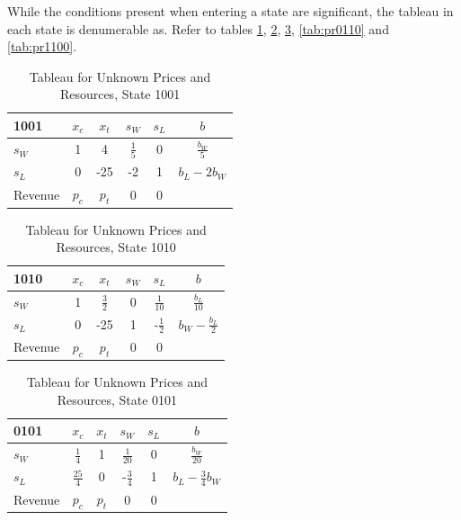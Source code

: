 While the conditions present when entering a state are significant, the tableau in each state is denumerable as. Refer to tables \ref{tab:pr1001}, \ref{tab:pr1010}, \ref{tab:pr0101}, \ref{tab:pr0110} and \ref{tab:pr1100}. 

\begin{table}
\centering
\begin{tabular}{| l | c c c c | c |}
\hline
1001    & $x_c$ & $x_t$ & $s_W$ & $s_L$ & $b$\\
\hline
$s_W$   & 1     & 4      & $\frac{1}{5}$   & 0     & $\frac{b_W}{5}$\\
$s_L$   & 0     & -25    & -2              & 1     & $b_L - 2b_W$\\
\hline
Revenue & $p_c$    & $p_t$    & 0     & 0     &\\
\hline
\end{tabular}
  \caption[Tableau for Unknown Prices and Resources, State 1001]
          {Tableau for Unknown Prices and Resources, State 1001}
  \label{tab:pr1001}
\end{table}

\begin{table}
\centering
\begin{tabular}{| l | c c c c | c |}
\hline
1010    & $x_c$ & $x_t$ & $s_W$ & $s_L$ & $b$\\
\hline
$s_W$   & 1     & $\frac{3}{2}$  & 0   & $\frac{1}{10}$  & $\frac{b_L}{10}$\\
$s_L$   & 0     & -25            & 1   & -$\frac{1}{2}$  & $b_W - \frac{b_L}{2}$\\
\hline
Revenue & $p_c$    & $p_t$    & 0     & 0     &\\
\hline
\end{tabular}
  \caption[Tableau for Unknown Prices and Resources, State 1010]
          {Tableau for Unknown Prices and Resources, State 1010}
  \label{tab:pr1010}
\end{table}

\begin{table}
\centering
\begin{tabular}{| l | c c c c | c |}
\hline
0101    & $x_c$ & $x_t$ & $s_W$ & $s_L$ & $b$\\
\hline
$s_W$   & $\frac{1}{4}$   & 1  & $\frac{1}{20}$   & 0  & $\frac{b_W}{20}$\\
$s_L$   & $\frac{25}{4}$  & 0  & -$\frac{3}{4}$   & 1  & $b_L - \frac{3}{4}b_W$\\
\hline
Revenue & $p_c$    & $p_t$    & 0     & 0     &\\
\hline
\end{tabular}
  \caption[Tableau for Unknown Prices and Resources, State 0101]
          {Tableau for Unknown Prices and Resources, State 0101}
  \label{tab:pr0101}
\end{table}

